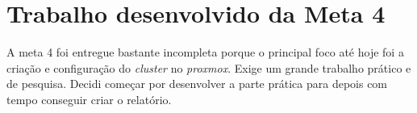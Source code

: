 \section{Trabalho desenvolvido da Meta 4}
A meta 4 foi entregue bastante incompleta porque o principal foco até hoje foi a criação e configuração do \textit{cluster} no \textit{proxmox}. Exige um grande trabalho prático e de pesquisa. Decidi começar por desenvolver a parte prática para depois com tempo conseguir criar o relatório.